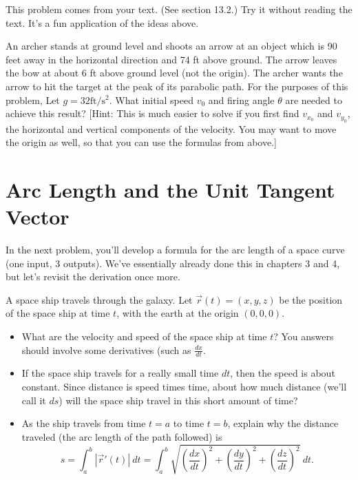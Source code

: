 This problem comes from your text. (See section 13.2.)  Try it without reading the text.  It's a fun application of the ideas above.
\begin{problem}%
 An archer stands at ground level and shoots an arrow at an object which is 90 feet away in the horizontal direction and 74 ft above ground. The arrow leaves the bow at about 6 ft above ground level (not the origin). 
 The archer wants the arrow to hit the target at the peak of its parabolic path. 
 For the purposes of this problem, Let $g = 32 \text{ft}/\text{s}^2$. 
 What initial speed $v_0$ and firing angle $\theta$ are needed to achieve this result? 
 [Hint: This is much easier to solve if you first find $v_{x_0}$ and $v_{y_0}$, the horizontal and vertical components of the velocity. You may want to move the origin as well, so that you can use the formulas from above.]
\end{problem}

\section{Arc Length and the Unit Tangent Vector}

 In the next problem, you'll develop a formula for the arc length of a space curve (one input, 3 outputs).  We've essentially already done this in chapters 3 and 4, but let's revisit the derivation once more.
\begin{problem}
A space ship travels through the galaxy. Let $\vec r(t) = (x,y,z)$ 
%
be the position of the space ship at time $t$, with the earth at the origin $(0,0,0)$. 
\begin{itemize}
 \item What are the velocity and speed of the space ship at time $t$? You answers should involve some derivatives (such as $\frac{dx}{dt}$.
 \item If the space ship travels for a really small time $dt$, then the speed is about constant. Since distance is speed times time, about how much distance (we'll call it $ds$) will the space ship travel in this short amount of time?
 \item As the ship travels from time $t=a$ to time $t=b$, explain why the distance traveled (the arc length of the path followed) is $$s=\int_a^b |\vec r '(t)|\ dt = \int_a^b \sqrt{\left(\frac{dx}{dt}\right)^2+\left(\frac{dy}{dt}\right)^2+\left(\frac{dz}{dt}\right)^2}\ dt .$$
\end{itemize}

\end{problem}

